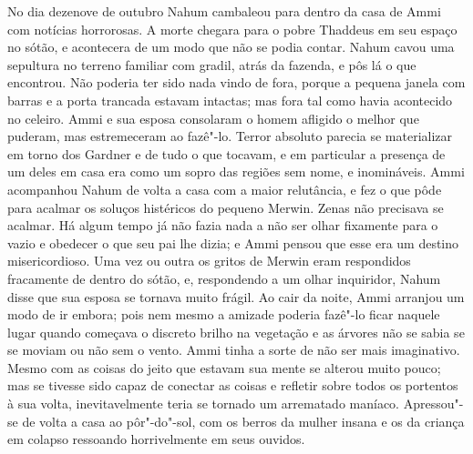 No dia dezenove de outubro Nahum cambaleou para dentro da casa de Ammi
com notícias horrorosas. A morte chegara para o pobre Thaddeus em seu
espaço no sótão, e acontecera de um modo que não se podia contar. Nahum
cavou uma sepultura no terreno familiar com gradil, atrás da fazenda, e
pôs lá o que encontrou. Não poderia ter sido nada vindo de fora, porque
a pequena janela com barras e a porta trancada estavam intactas; mas
fora tal como havia acontecido no celeiro. Ammi e sua esposa consolaram
o homem afligido o melhor que puderam, mas estremeceram ao fazê"-lo.
Terror absoluto parecia se materializar em torno dos Gardner e de tudo o
que tocavam, e em particular a presença de um deles em casa era como um
sopro das regiões sem nome, e inomináveis. Ammi acompanhou Nahum de
volta a casa com a maior relutância, e fez o que pôde para acalmar os
soluços histéricos do pequeno Merwin. Zenas não precisava se acalmar. Há
algum tempo já não fazia nada a não ser olhar fixamente para o vazio e
obedecer o que seu pai lhe dizia; e Ammi pensou que esse era um destino
misericordioso. Uma vez ou outra os gritos de Merwin eram respondidos
fracamente de dentro do sótão, e, respondendo a um olhar inquiridor,
Nahum disse que sua esposa se tornava muito frágil. Ao cair da noite,
Ammi arranjou um modo de ir embora; pois nem mesmo a amizade poderia
fazê"-lo ficar naquele lugar quando começava o discreto brilho na
vegetação e as árvores não se sabia se se moviam ou não sem o vento.
Ammi tinha a sorte de não ser mais imaginativo. Mesmo com as coisas do
jeito que estavam sua mente se alterou muito pouco; mas se tivesse sido
capaz de conectar as coisas e refletir sobre todos os portentos à sua
volta, inevitavelmente teria se tornado um arrematado maníaco.
Apressou"-se de volta a casa ao pôr"-do"-sol, com os berros da mulher
insana e os da criança em colapso ressoando horrivelmente em seus
ouvidos.

